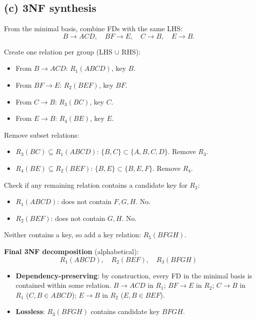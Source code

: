\documentclass[11pt]{article}
\begin{document}
\subsection*{(c) 3NF synthesis}

From the minimal basis, combine FDs with the same LHS:
\[
B \to ACD,\quad BF \to E,\quad C \to B,\quad E \to B.
\]

Create one relation per group (LHS $\cup$ RHS):
\begin{itemize}
\item From $B \to ACD$: $R_1(ABCD)$, key $B$.
\item From $BF \to E$: $R_2(BEF)$, key $BF$.
\item From $C \to B$: $R_3(BC)$, key $C$.
\item From $E \to B$: $R_4(BE)$, key $E$.
\end{itemize}

Remove subset relations:
\begin{itemize}
\item $R_3(BC) \subseteq R_1(ABCD)$: $\{B,C\} \subset \{A,B,C,D\}$.
      Remove $R_3$.
\item $R_4(BE) \subseteq R_2(BEF)$: $\{B,E\} \subset \{B,E,F\}$.
      Remove $R_4$.
\end{itemize}

Check if any remaining relation contains a candidate key for $R_2$:
\begin{itemize}
\item $R_1(ABCD)$: does not contain $F, G, H$. No.
\item $R_2(BEF)$: does not contain $G, H$. No.
\end{itemize}

Neither contains a key, so add a key relation: $R_5(BFGH)$.

\medskip
\textbf{Final 3NF decomposition} (alphabetical):
\[
\boxed{\;R_1(ABCD),\quad R_2(BEF),\quad R_3(BFGH)\;}
\]

\begin{itemize}
\item \textbf{Dependency-preserving}: by construction, every FD in the
      minimal basis is contained within some relation.
      $B \to ACD$ in $R_1$; $BF \to E$ in $R_2$;
      $C \to B$ in $R_1$ ($C, B \in ABCD$);
      $E \to B$ in $R_2$ ($E, B \in BEF$).
\item \textbf{Lossless}: $R_3(BFGH)$ contains candidate key $BFGH$.
\end{itemize}
\end{document}

